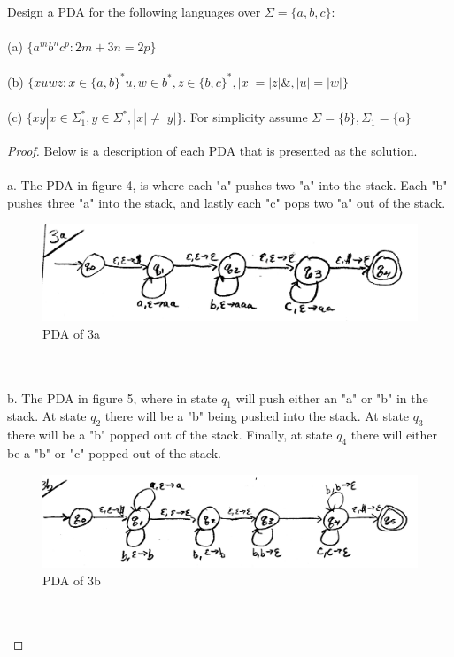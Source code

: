 \documentclass[12pt]{article}
\newenvironment{exercise}[2][Exercise]{\begin{trivlist}
\item[\hskip \labelsep {\bfseries #1}\hskip \labelsep {\bfseries #2.}]}{\end{trivlist}}
\begin{document}
\begin{exercise}{3}
Design a PDA for the following languages over $\Sigma = \{a,b,c\}:$ \\ \\
(a) $\{a^{m}b^{n}c^{p}: 2m + 3n = 2p\}$ \\ \\
(b) $\{xuwz: x \in \{a,b\}^{*} u,w \in b^{*}, z \in \{b, c\}^{*}, |x| = |z| \&, |u| = |w|\}$ \\ \\ 
(c) $\{xy | x \in \Sigma^{*}_{1}, y \in \Sigma^{*}, |x| \neq |y|\}$. For simplicity assume $\Sigma = \{b\}, \Sigma_{1} = \{a\}$
\end{exercise}

\begin{proof}
Below is a description of each PDA that is presented as the solution. \\ \\ 
a. The PDA in figure 4, is where each "a" pushes two "a" into the stack. Each "b" pushes three "a" into the stack, and lastly each "c" pops two "a" out of the stack. 
\begin{figure}
  \includegraphics[width=\linewidth]{3a.png}
  \caption{PDA of 3a}
\end{figure} \\ \\ 
b. The PDA in figure 5, where in state $q_{1}$ will push either an "a" or "b" in the stack. At state $q_{2}$ there will be a "b" being pushed into the stack. At state $q_{3}$ there will be a "b" popped out of the stack. Finally, at state $q_{4}$ there will either be a "b" or "c" popped out of the stack. 
\begin{figure}
  \includegraphics[width=\linewidth]{3b.png}
  \caption{PDA of 3b}
\end{figure} \\ \\

\end{proof}
\end{document}
